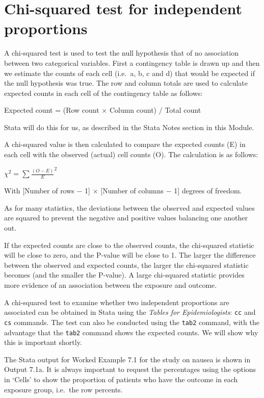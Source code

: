 \documentclass[
]{memoir}
\begin{document}
\hypertarget{chi-squared-test-for-independent-proportions}{%
\section{Chi-squared test for independent proportions}\label{chi-squared-test-for-independent-proportions}}

A chi-squared test is used to test the null hypothesis that of no association between two categorical variables. First a contingency table is drawn up and then we estimate the counts of each cell (i.e.~a, b, c and d) that would be expected if the null hypothesis was true. The row and column totals are used to calculate expected counts in each cell of the contingency table as follows:

Expected count = (Row count × Column count) / Total count

Stata will do this for us, as described in the Stata Notes section in this Module.

A chi-squared value is then calculated to compare the expected counts (E) in each cell with the observed (actual) cell counts (O). The calculation is as follows:

\(\chi ^ 2 = \sum \frac{(O - E)}{E} ^2\)

With {[}Number of rows \(-\) 1{]} \(\times\) {[}Number of columns \(-\) 1{]} degrees of freedom.

As for many statistics, the deviations between the observed and expected values are squared to prevent the negative and positive values balancing one another out.

If the expected counts are close to the observed counts, the chi-squared statistic will be close to zero, and the P-value will be close to 1. The larger the difference between the observed and expected counts, the larger the chi-squared statistic becomes (and the smaller the P-value). A large chi-squared statistic provides more evidence of an association between the exposure and outcome.

A chi-squared test to examine whether two independent proportions are associated can be obtained in Stata using the \emph{Tables for Epidemiologists}: \texttt{cc} and \texttt{cs} commands. The test can also be conducted using the \texttt{tab2} command, with the advantage that the \texttt{tab2} command shows the expected counts. We will show why this is important shortly.

The Stata output for Worked Example 7.1 for the study on nausea is shown in Output 7.1a. It is always important to request the percentages using the options in `Cells' to show the proportion of patients who have the outcome in each exposure group, i.e.~the row percents.
\end{document}

